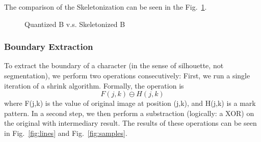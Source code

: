 \documentclass{article}
\begin{document}
The comparison of the Skeletonization can be seen in the Fig.~\ref{fig:skeleton}.
\begin{figure}
\caption{Quantized B v.s. Skeletonized B}\label{fig:skeleton}
\end{figure}

\subsubsection{Boundary Extraction}
To extract the boundary of a character (in the sense of silhouette, not segmentation), we perform two operations consecutively:
First, we run a single iteration of a shrink algorithm. Formally, the operation is
\begin{equation}
F(j,k) \ominus H(j,k)
\end{equation}
where F(j,k) is the value of original image at position (j,k), and H(j,k) is a mark pattern. In a second step, we then perform a substraction (logically: a XOR) on the original with intermediary result. The results of these operations can be seen in Fig.~\ref{fig:lines} and Fig.~\ref{fig:samples}.
\end{document}
